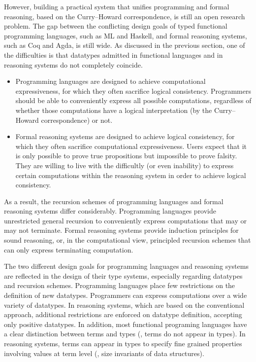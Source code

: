 However, building a practical system that unifies programming and
formal reasoning, based on the Curry--Howard correspondence, is still
an open research problem. The gap between the conflicting design goals of
typed functional programming languages, such as ML and Haskell, and
formal reasoning systems, such as Coq and Agda, is still wide.
As discussed in the previous section, one of the difficulties is
that datatypes admitted in functional languages and in reasoning systems
do not completely coincide.

\begin{itemize}

\item
Programming languages are designed to achieve computational expressiveness,
for which they often sacrifice logical consistency.
Programmers should be able to conveniently express all possible computations,
regardless of whether those computations have a logical interpretation
(by the Curry--Howard correspondence) or not.

\item
Formal reasoning systems are designed to achieve logical consistency,
for which they often sacrifice computational expressiveness.
Users expect that it is only possible to prove true propositions
but impossible to prove falsity. They are willing to live with
the difficultly (or even inability) to express certain computations
within the reasoning system in order to achieve logical consistency.

\end{itemize}

As a result, the recursion schemes of programming languages and
formal reasoning systems differ considerably.
Programming languages provide unrestricted general recursion
to conveniently express computations that may or may not terminate.
Formal reasoning systems provide induction principles for sound reasoning,
or, in the computational view, principled recursion schemes that can only
express terminating computation.

The two different design goals for programming languages and reasoning systems
are reflected in the design of their type systems, especially regarding
datatypes and recursion schemes. Programming languages place few restrictions
on the definition of new datatypes. Programmers can express computations over
a wide variety of datatypes. In reasoning systems, which are based on
the conventional approach, additional restrictions are enforced on
datatype definition, accepting only positive datatypes. In addition,
most functional programing languages have a clear distinction between
terms and types (\ie, terms do not appear in types). In reasoning systems,
terms can appear in types to specify fine grained properties involving
values at term level (\eg, size invariants of data structures).

